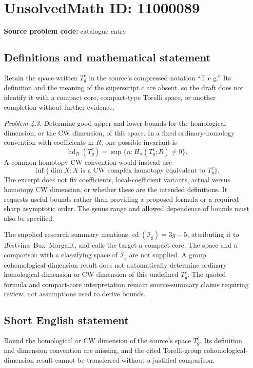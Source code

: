 \documentclass[11pt]{article}
\begin{document}
\section*{UnsolvedMath ID: 11000089}
\textbf{Source problem code:} catalogue entry
\subsection{Definitions and mathematical statement}
Retain the space written \(T_g^c\) in the source's compressed notation ``T c g.'' Its definition and the meaning of the superscript \(c\) are absent, so the draft does not identify it with a compact core, compact-type Torelli space, or another completion without further evidence.

\emph{Problem 4.3.} Determine good upper and lower bounds for the homological dimension, or the CW dimension, of this space. In a fixed ordinary-homology convention with coefficients in \(R\), one possible invariant is
\[
 \operatorname{hd}_R(T_g^c)=\sup\{n:H_n(T_g^c;R)\neq0\}.
\]
A common homotopy-CW convention would instead use
\[
 \inf\{\dim X:X\text{ is a CW complex homotopy equivalent to }T_g^c\}.
\]
The excerpt does not fix coefficients, local-coefficient variants, actual versus homotopy CW dimension, or whether these are the intended definitions. It requests useful bounds rather than providing a proposed formula or a required sharp asymptotic order. The genus range and allowed dependence of bounds must also be specified.

The supplied research summary mentions \(\operatorname{cd}(\mathcal I_g)=3g-5\), attributing it to Bestvina--Bux--Margalit, and calls the target a compact core. The space and a comparison with a classifying space of \(\mathcal I_g\) are not supplied. A group cohomological-dimension result does not automatically determine ordinary homological dimension or CW dimension of this undefined \(T_g^c\). The quoted formula and compact-core interpretation remain source-summary claims requiring review, not assumptions used to derive bounds.
\subsection{Short English statement}
Bound the homological or CW dimension of the source's space \(T_g^c\). Its definition and dimension convention are missing, and the cited Torelli-group cohomological-dimension result cannot be transferred without a justified comparison.
\end{document}
